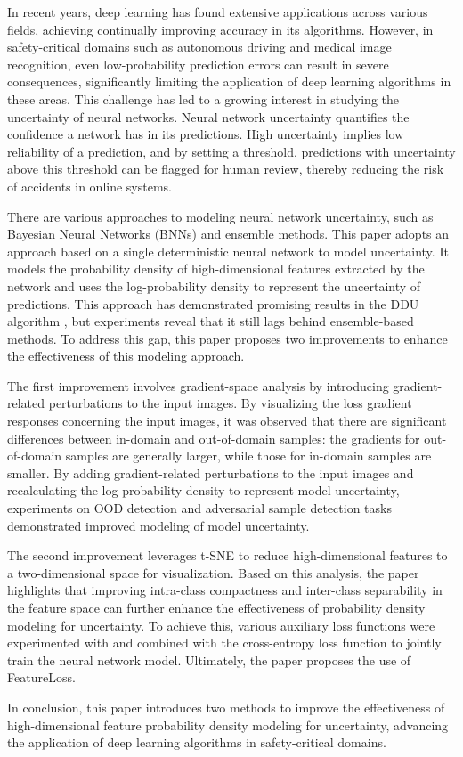 \documentclass[type=master]{fduthesis}
\begin{document}
\begin{abstract*}
In recent years, deep learning has found extensive applications across various fields, achieving continually improving accuracy in its algorithms. However, in safety-critical domains such as autonomous driving and medical image recognition, even low-probability prediction errors can result in severe consequences, significantly limiting the application of deep learning algorithms in these areas. This challenge has led to a growing interest in studying the uncertainty of neural networks. Neural network uncertainty quantifies the confidence a network has in its predictions. High uncertainty implies low reliability of a prediction, and by setting a threshold, predictions with uncertainty above this threshold can be flagged for human review, thereby reducing the risk of accidents in online systems.

There are various approaches to modeling neural network uncertainty, such as Bayesian Neural Networks (BNNs) and ensemble methods. This paper adopts an approach based on a single deterministic neural network to model uncertainty. It models the probability density of high-dimensional features extracted by the network and uses the log-probability density to represent the uncertainty of predictions. This approach has demonstrated promising results in the DDU algorithm \cite{Mukhoti_2023_CVPR}, but experiments reveal that it still lags behind ensemble-based methods. To address this gap, this paper proposes two improvements to enhance the effectiveness of this modeling approach.

The first improvement involves gradient-space analysis by introducing gradient-related perturbations to the input images. By visualizing the loss gradient responses concerning the input images, it was observed that there are significant differences between in-domain and out-of-domain samples: the gradients for out-of-domain samples are generally larger, while those for in-domain samples are smaller. By adding gradient-related perturbations to the input images and recalculating the log-probability density to represent model uncertainty, experiments on OOD detection and adversarial sample detection tasks demonstrated improved modeling of model uncertainty.

The second improvement leverages t-SNE to reduce high-dimensional features to a two-dimensional space for visualization. Based on this analysis, the paper highlights that improving intra-class compactness and inter-class separability in the feature space can further enhance the effectiveness of probability density modeling for uncertainty. To achieve this, various auxiliary loss functions were experimented with and combined with the cross-entropy loss function to jointly train the neural network model. Ultimately, the paper proposes the use of FeatureLoss.

In conclusion, this paper introduces two methods to improve the effectiveness of high-dimensional feature probability density modeling for uncertainty, advancing the application of deep learning algorithms in safety-critical domains.
\end{abstract*}
\end{document}
